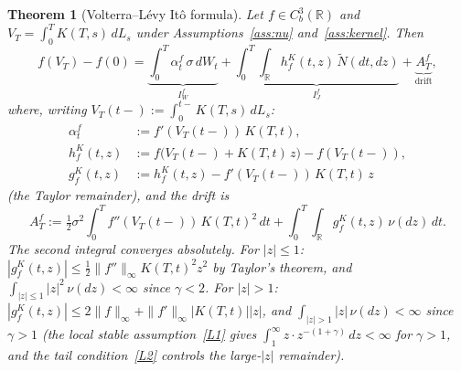 \documentclass[11pt,a4paper]{article}
\theoremstyle{plain}
\newtheorem{theorem}{Theorem}[section]
\theoremstyle{definition}
\theoremstyle{remark}
\newcommand{\R}{\mathbb{R}}
\newcommand{\Ntilde}{\widetilde{N}}
\begin{document}
\begin{theorem}[Volterra--L\'evy It\^o formula]\label{thm:VL-ito}
Let $f \in C_b^3(\R)$ and $V_T = \int_0^T K(T,s)\,dL_s$ under
Assumptions~\ref{ass:nu} and~\ref{ass:kernel}.  Then
\begin{equation}\label{eq:VL-ito}
  f(V_T) - f(0)
  = \underbrace{\int_0^T \alpha_t^f\,\sigma\,dW_t}_{I_W^f}
  + \underbrace{\int_0^T\!\!\int_\R h_f^K(t,z)\,\Ntilde(dt,dz)}_{I_J^f}
  + \underbrace{A_T^f}_{\text{drift}},
\end{equation}
where, writing $V_T(t\!-\!) := \int_0^{t-} K(T,s)\,dL_s$:
\begin{align}
  \alpha_t^f &:= f'(V_T(t\!-\!))\,K(T,t),
  \label{eq:alpha}\\[4pt]
  h_f^K(t,z) &:= f\bigl(V_T(t\!-\!) + K(T,t)\,z\bigr)
  - f(V_T(t\!-\!)),
  \label{eq:hfK}\\[4pt]
  g_f^K(t,z) &:= h_f^K(t,z) - f'(V_T(t\!-\!))\,K(T,t)\,z
  \label{eq:gfK-thm}
\end{align}
(the Taylor remainder), and the drift is
\begin{equation}\label{eq:drift}
  A_T^f := \tfrac{1}{2}\sigma^2\!\int_0^T
  f''(V_T(t\!-\!))\,K(T,t)^2\,dt
  + \int_0^T\!\!\int_\R g_f^K(t,z)\,\nu(dz)\,dt.
\end{equation}
The second integral converges absolutely.
For $|z| \leq 1$:
$|g_f^K(t,z)| \leq \frac{1}{2}\|f''\|_\infty K(T,t)^2 z^2$
by Taylor's theorem, and $\int_{|z|\leq 1}|z|^2\,\nu(dz) < \infty$
since $\gamma < 2$.
For $|z| > 1$: $|g_f^K(t,z)| \leq 2\|f\|_\infty
+ \|f'\|_\infty|K(T,t)||z|$, and
$\int_{|z|>1}|z|\,\nu(dz) < \infty$ since $\gamma > 1$
(the local stable assumption~\ref{L1} gives
$\int_1^\infty z \cdot z^{-(1+\gamma)}\,dz < \infty$
for $\gamma > 1$, and the tail condition~\ref{L2} controls
the large-$|z|$ remainder).
\end{theorem}
\end{document}
